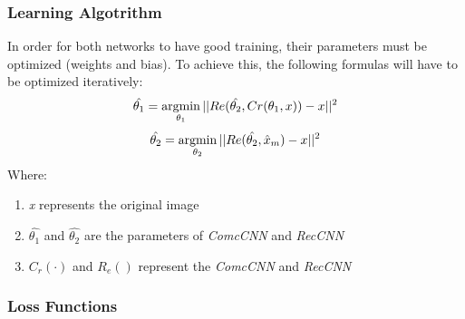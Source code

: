 \subsubsection{Learning Algotrithm}
In order for both networks to have good training, their parameters must be 
optimized (weights and bias). To achieve this, the following formulas will 
have to be optimized iteratively:
\begin{equation}
    \hat{\theta_1} = \operatorname*{argmin}\limits_{\theta_1}||Re(\hat{\theta_2},Cr(\theta_1,x))-x||^2
\end{equation}
\begin{equation}
    \hat{\theta_2} = \operatorname*{argmin}\limits_{\theta_2}||Re(\hat{\theta_2},\hat{x}_m)-x||^2
\end{equation}
Where:
\begin{enumerate}
    \item \emph{x} represents the original image
    \item $ \hat{\theta_1} $ and $ \hat{\theta_2} $ are the parameters of \emph{ComcCNN} and \emph{RecCNN}
    \item $ C_r(\cdot) $ and $ R_e() $ represent the \emph{ComcCNN} and \emph{RecCNN}
\end{enumerate}

\subsubsection{Loss Functions}


